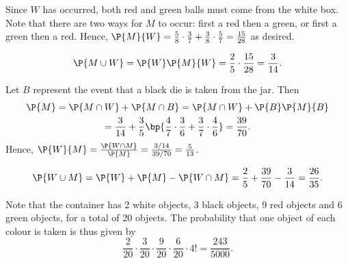 \begin{solution}
    Since $W$ has occurred, both red and green balls must come from the white box. Note that there are two ways for $M$ to occur: first a red then a green, or first a green then a red. Hence, $\P{M}{W} = \frac58 \cdot \frac37 + \frac38 \cdot \frac57 = \frac{15}{28}$ as desired.

    \begin{ppart}
        \[\P{M \cup W} = \P{W} \P{M}{W} = \frac25 \cdot \frac{15}{28} = \frac{3}{14}.\]
    \end{ppart}
    \begin{ppart}
        Let $B$ represent the event that a black die is taken from the jar. Then 
        \begin{gather*}
            \P{M} = \P{M \cap W} + \P{M \cap B} = \P{M \cap W} + \P{B} \P{M}{B} \\
            = \frac{3}{14} + \frac35 \bp{\frac47\cdot\frac36 + \frac37\cdot\frac46} = \frac{39}{70}.
        \end{gather*}
        Hence, $\P{W}{M} = \frac{\P{W \cap M}}{\P{M}} = \frac{3/14}{39/70} = \frac5{13}$.
    \end{ppart}
    \begin{ppart}
        \[\P{W \cup M} = \P{W} + \P{M} - \P{W \cap M} = \frac25 + \frac{39}{70} - \frac{3}{14} = \frac{26}{35}.\]
    \end{ppart}

    Note that the container has 2 white objects, 3 black objects, 9 red objects and 6 green objects, for a total of 20 objects. The probability that one object of each colour is taken is thus given by \[\frac2{20} \cdot \frac{3}{20} \cdot \frac9{20} \cdot \frac6{20} \cdot 4! = \frac{243}{5000}.\]
\end{solution}

